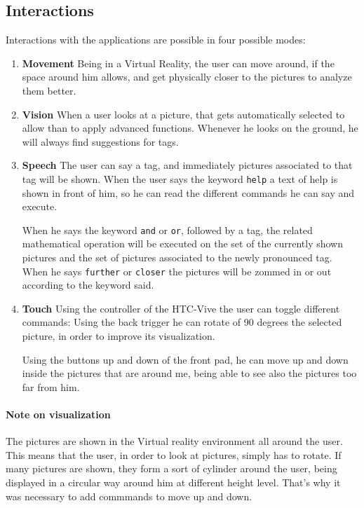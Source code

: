 \documentclass[11pt,a4paper]{article}
\begin{document}
\subsection{Interactions}
Interactions with the applications are possible in four possible modes:
\begin{enumerate}
\item \textbf{Movement} Being in a Virtual Reality, the user can move around, if the space around him allows, and get physically closer to the pictures to analyze them better.

\item \textbf{Vision}
When a user looks at a picture, that gets automatically selected to allow than to apply advanced functions.
Whenever he looks on the ground, he will always find suggestions for tags.

\item \textbf{Speech} The user can say a tag, and immediately pictures associated to that tag will be shown.
When the user says the keyword \texttt{help} a text of help is shown in front of him, so he can read the different commands he can say and execute.

When he says the keyword \texttt{and} or \texttt{or}, followed by a tag, the related mathematical operation will be executed on the set of the currently shown pictures and the set of pictures associated to the newly pronounced tag.
When he says \texttt{further} or \texttt{closer} the pictures will be zommed in or out according to the keyword said.

\item \textbf{Touch} Using the controller of the HTC-Vive the user can toggle different commands:
Using the back trigger he can rotate of 90 degrees the selected picture, in order to improve its visualization.

Using the buttons up and down of the front pad, he can move up and down inside the pictures that are around me, being able to see also the pictures too far from him.

\end{enumerate}

\paragraph{Note on visualization} The pictures are shown in the Virtual reality environment all around the user. 
This means that the user, in order to look at pictures, simply has to rotate.
If many pictures are shown, they form a sort of cylinder around the user, being displayed in a circular way around him at different height level. That's why it was necessary to add commmands to move up and down.
\end{document}
